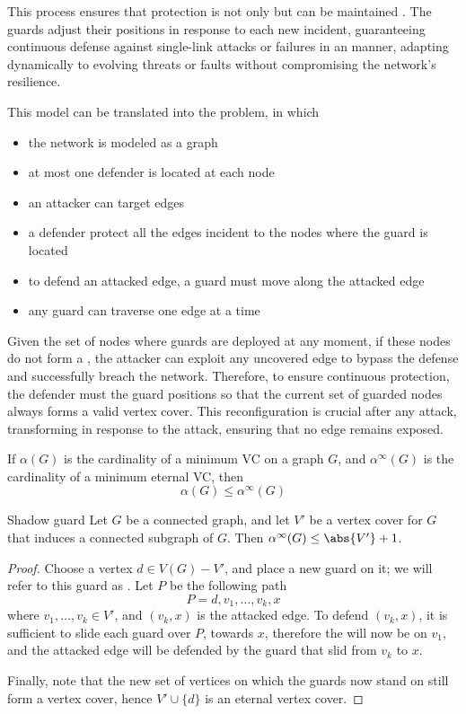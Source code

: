 \documentclass[a4paper, 12pt]{report}
\begin{document}
    This process ensures that protection is not only  but can be maintained . The guards adjust their positions in response to each new incident, guaranteeing continuous defense against single-link attacks or failures in an  manner, adapting dynamically to evolving threats or faults without compromising the network's resilience.

    This model can be translated into the  problem, in which

    \begin{itemize}
        \item the network is modeled as a graph
        \item at most one defender is located at each node
        \item an attacker can target edges
        \item a defender  protect all the edges incident to the nodes where the guard is located
        \item to defend an attacked edge, a guard must move along the attacked edge
        \item any guard can traverse one edge at a time
    \end{itemize}

    Given the set of nodes where guards are deployed at any moment, if these nodes do not form a , the attacker can exploit any uncovered edge to bypass the defense and successfully breach the network. Therefore, to ensure continuous protection, the defender must  the guard positions so that the current set of guarded nodes always forms a valid vertex cover. This reconfiguration is crucial after any attack, transforming  in response to the attack, ensuring that no edge remains exposed.

    If $\alpha (G)$ is the cardinality of a minimum VC on a graph $G$, and $\alpha ^{\infty}(G)$ is the cardinality of a minimum eternal VC, then $$\alpha(G) \le \alpha^{\infty}(G)$$

    \begin{framedthm}{Shadow guard}
        Let $G$ be a connected graph, and let $V'$ be a vertex cover for $G$ that induces a connected subgraph of $G$. Then $\alpha^{\infty}(G) \le \abs{V'} + 1$.
    \end{framedthm}

    \begin{proof}
        Choose a vertex $d \in V(G) - V'$, and place a new guard on it; we will refer to this guard as . Let $P$ be the following path $$P = d, v_1, \ldots, v_k, x$$ where $v_1, \ldots, v_k \in V'$, and $(v_k, x)$ is the attacked edge. To defend $(v_k, x)$, it is sufficient to slide each guard over $P$, towards $x$, therefore the  will now be on $v_1$, and the attacked edge will be defended by the guard that slid from $v_k$ to $x$.

        Finally, note that the new set of vertices on which the guards now stand on still form a vertex cover, hence $V' \cup \{d\}$ is an eternal vertex cover.
    \end{proof}
\end{document}
